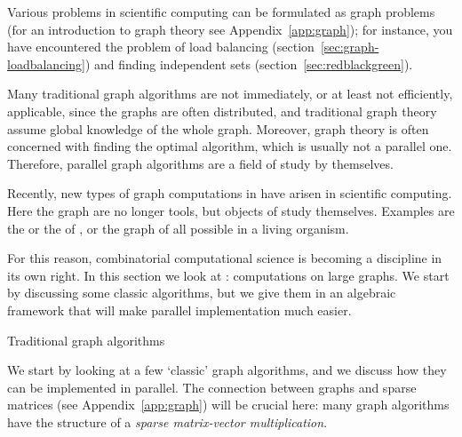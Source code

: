 \label{sec:graph-analytics}

Various problems in scientific computing can be formulated as graph
problems (for
an introduction to graph theory see Appendix~\ref{app:graph}); for
instance, you have 
encountered the problem of load
balancing (section~\ref{sec:graph-loadbalancing}) and finding
independent sets (section~\ref{sec:redblackgreen}).

Many traditional graph algorithms are
not immediately, or at least not efficiently, applicable, since the
graphs are often distributed, and traditional graph theory assume global
knowledge of the whole graph. Moreover, graph theory is often concerned
with finding the optimal algorithm, which is usually not a parallel one.
Therefore, parallel graph algorithms are a field of study by themselves.

Recently, new types of graph computations in have arisen in scientific
computing. Here the graph are no longer tools, but objects of study
themselves. Examples are the  or the
 of , or the graph
of all possible  in a living organism.

For this reason, combinatorial computational
science is becoming a discipline in its own right.
In this section we look at :
computations on large graphs. We start by discussing some classic
algorithms, but we give them in an algebraic framework that will
make parallel implementation much easier.

 {Traditional graph algorithms}

We start by looking at a few `classic' graph algorithms, and we
discuss how they can be implemented in parallel. The connection
between graphs and sparse matrices (see Appendix~\ref{app:graph}) will
be crucial here: many graph algorithms have the structure of
a \emph{sparse matrix-vector
multiplication}.

